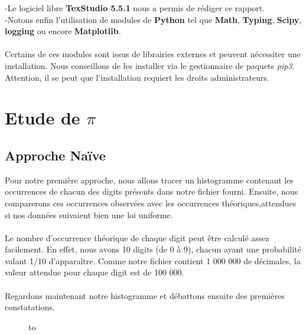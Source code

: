 \documentclass[french]{article}
\begin{document}
-Le logiciel libre \textbf{TexStudio 5.5.1} nous a permis de rédiger ce rapport.
\\

-Notons enfin l'utilisation de modules de \textbf{Python} tel que \textbf{Math}, \textbf{Typing}, \textbf{Scipy}, \textbf{logging} ou encore \textbf{Matplotlib}.
\\
\\
Certains de ces modules sont issus de librairies externes et peuvent nécessiter une installation. Nous conseillons de les installer via le gestionnaire de paquets \textit{pip3}. Attention, il se peut que l'installation requiert les droits administrateurs.

\section{Etude de $\pi$ }
\subsection{Approche Naïve}
Pour notre première approche, nous allons tracer un histogramme contenant les occurrences de chacun des digits présents dans notre fichier fourni. Ensuite, nous comparerons ces occurrences observées avec les occurrences théoriques,attendues si nos données suivaient bien une loi uniforme. 
\\
\\
Le nombre d'occurrence théorique de chaque digit peut être calculé assez facilement. En effet, nous avons 10 digits (de 0 à 9), chacun ayant une probabilité valant 1/10 d'apparaître. Comme notre fichier contient 1 000 000 de décimales, la valeur attendue pour chaque digit est de 100 000.
\\
\\
Regardons maintenant notre histogramme et débattons ensuite des premières constatations.

\begin{figure}[h!]
	\hbox to
	\caption{\label{toucan}}
\end{figure}
\end{document}

